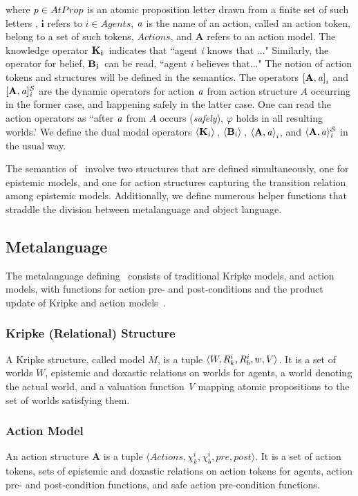 where $\mathit{p} \in AtProp$ is an atomic proposition letter drawn from a finite set of such letters , $\mathbf{i}$ refers to $i \in Agents$, $\mathbf{\mathit{a}}$ is the name of an action, called an action token, belong to a set of such tokens, $Actions$, and $\mathbf{A}$ refers to an action model. The knowledge operator $\mathbf{K}_{\mathbf{i}}\,$ indicates that ``agent \emph{i} knows that ..." Similarly, the operator for belief, $\mathbf{B}_{\mathbf{i}}\,$ can be read, ``agent \emph{i} believes that..." The notion of action tokens and structures will be defined in the semantics. The operators $\mathbf{[A,\mathit{a}]}_i$ and $\mathbf{[A,\mathit{a}]_{\mathit{i}}^\mathcal{S}}$ are the dynamic operators for action $\mathit{a}$ from action structure $A$ occurring in the former case, and happening safely in the latter case. One can read the action operators as ``after $\mathit{a}$ from $A$ occurs (\emph{safely}), $\varphi$ holds in all resulting worlds.' We define the dual modal operators $\langle \mathbf{K}_{i} \rangle\,$, $\langle \mathbf{B}_{i} \rangle\,$, $\mathbf{\langle A,\mathit{a}\rangle}_i$, and $\mathbf{\langle A,\mathit{a}\rangle_{\mathit{i}}^\mathcal{S}}$ in the usual way. 

The semantics of \DASL\ involve two structures that are defined simultaneously, one for epistemic models, and one for action structures capturing the transition relation among epistemic models. Additionally, we define numerous helper functions that straddle the division between metalanguage and object language. 

\subsection{Metalanguage}

The metalanguage defining \DASL\ consists of traditional Kripke models, and action models, with functions for action pre- and post-conditions and the product update of Kripke and action models~\cite{DEL}.

\subsubsection{Kripke (Relational) Structure}%
A Kripke structure, called model $M$, is a tuple $\langle W, R_{k}^i, R_{b}^i, w, V \rangle$. It is a set of worlds $W$, epistemic and doxastic relations on worlds for agents, a world denoting the actual world, and a valuation function \emph{V} mapping atomic propositions to the set of worlds satisfying them.

\subsubsection{Action Model}
An action structure $\mathbf{A}$ is a tuple $\langle Actions,\chi_{k}^i, \chi_{b}^i, pre, post \rangle$. It is a set of action tokens, sets of epistemic and doxastic relations on action tokens for agents, action pre- and post-condition functions, and safe action pre-condition functions.  

